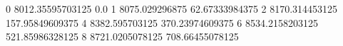 0 8012.35595703125 0.0
1 8075.029296875 62.67333984375
2 8170.314453125 157.95849609375
4 8382.595703125 370.23974609375
6 8534.2158203125 521.85986328125
8 8721.0205078125 708.66455078125
